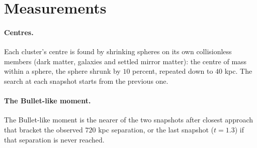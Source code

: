 \documentclass[11pt]{article}
\theoremstyle{definition}
\begin{document}
\section{Measurements}\label{sec:measure}

\paragraph{Centres.} Each cluster's centre is found by shrinking spheres on its own collisionless members (dark matter, galaxies and settled mirror matter): the centre of mass within a sphere, the sphere shrunk by $10$ percent, repeated down to $40$ kpc. The search at each snapshot starts from the previous one.

\paragraph{The Bullet-like moment.} The Bullet-like moment is the nearer of the two snapshots after closest approach that bracket the observed $720$ kpc separation, or the last snapshot ($t = 1.3$) if that separation is never reached.
\end{document}
